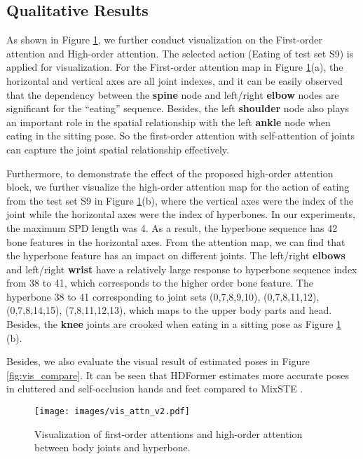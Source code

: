 \documentclass{article}
\begin{document}
\subsection{Qualitative Results}
As shown in Figure \ref{fig:vis_attn}, we further conduct visualization on the First-order attention and High-order attention. The selected action (Eating of test set S9) is applied for visualization. For the First-order attention map in Figure \ref{fig:vis_attn}(a), the horizontal and vertical axes are all joint indexes, and it can be easily observed that the dependency between the \textbf{spine} node and left/right \textbf{elbow} nodes are significant for the “eating” sequence. Besides, the left \textbf{shoulder} node also plays an important role in the spatial relationship with the left \textbf{ankle} node when eating in the sitting pose. So the first-order attention with self-attention of joints can capture the joint spatial relationship effectively.

Furthermore, to demonstrate the effect of the proposed high-order attention block, we further visualize the high-order attention map for the action of eating from the test set S9 in Figure \ref{fig:vis_attn}(b), where the vertical axes were the index of the joint while the horizontal axes were the index of hyperbones. In our experiments, the maximum SPD length was 4. As a result, the hyperbone sequence has 42 bone features in the horizontal axes. From the attention map, we can find that the hyperbone feature has an impact on different joints. The left/right \textbf{elbows} and left/right \textbf{wrist} have a relatively large response to hyperbone sequence index from 38 to 41, which corresponds to the higher order bone feature. The hyperbone 38 to 41 corresponding to joint sets (0,7,8,9,10), (0,7,8,11,12), (0,7,8,14,15), (7,8,11,12,13), which maps to the upper body parts and head. Besides, the \textbf{knee} joints are crooked when eating in a sitting pose as Figure \ref{fig:vis_attn} (b).

Besides, we also evaluate the visual result of estimated poses in Figure \ref{fig:vis_compare}. It can be seen that HDFormer estimates more accurate poses in cluttered and self-occlusion hands and feet compared to MixSTE \cite{ZhangCVPR22MixSTE}.

\begin{figure}[!t]
    \centering
    \texttt{[image: images/vis\_attn\_v2.pdf]}
    \vspace{-6mm}
    \caption{\small Visualization of first-order attentions and high-order attention between body joints and hyperbone.}
    \vspace{-1mm}
    \label{fig:vis_attn}
\end{figure}
\end{document}

